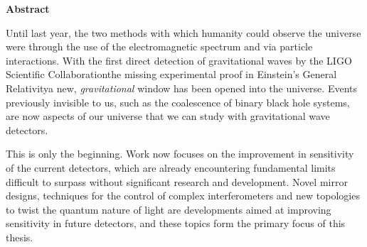 \vspace*{1.75in}
\begin{center} {\bf Abstract}\end{center}

Until last year, the two methods with which humanity could observe the universe were through the use of the electromagnetic spectrum and via particle interactions. With the first direct detection of gravitational waves by the LIGO Scientific Collaboration\textemdash the missing experimental proof in Einstein's General Relativity\textemdash a new, \emph{gravitational} window has been opened into the universe. Events previously invisible to us, such as the coalescence of binary black hole systems, are now aspects of our universe that we can study with gravitational wave detectors.

This is only the beginning. Work now focuses on the improvement in sensitivity of the current detectors, which are already encountering fundamental limits difficult to surpass without significant research and development. Novel mirror designs, techniques for the control of complex interferometers and new topologies to twist the quantum nature of light are developments aimed at improving sensitivity in future detectors, and these topics form the primary focus of this thesis.